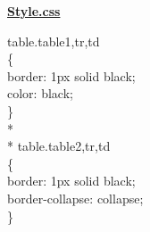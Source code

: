 
\begin{center}
{\Huge \bf\underline{{{Style.css}}}\vskip 0.2in}
\end{center}
table.table1,tr,td\\
\{\\
border: 1px solid black;\\
color: black;\\
\}\\* \\*
table.table2,tr,td\\
\{\\
border: 1px solid black;\\
border-collapse: collapse;\\
\}
